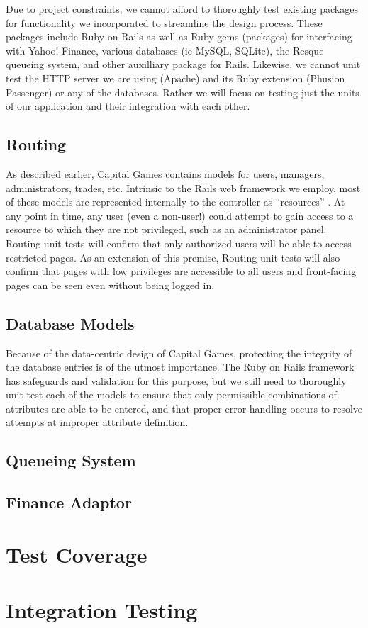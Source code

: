 Due to project constraints, we cannot afford to thoroughly
test existing packages for functionality we incorporated to
streamline the design process. These packages include Ruby
on Rails
as well as Ruby gems (packages) for interfacing with Yahoo! Finance,
various databases (ie MySQL, SQLite), the Resque queueing system,
and other auxilliary package for Rails. Likewise, we
cannot unit test
the HTTP server we are using (Apache) and its Ruby 
extension (Phusion Passenger) or any of the databases. Rather
we will focus on testing just the units of our application and
their integration with each other.

\subsection{Routing}

As described earlier, Capital Games contains models for
users, managers, administrators, trades, etc. Intrinsic to the Rails web framework
we employ, most of these models are represented internally to the 
controller as ``resources'' \cite{guides:routing}. At any
point in time, any user (even a non-user!) could attempt to gain
access to a resource to which they are not privileged, such as an
administrator panel. Routing unit tests will confirm that only
authorized users will be able to access restricted pages. As an
extension of this premise, Routing unit tests will also confirm
that pages with low privileges are accessible to all users and
front-facing pages can be seen even without being logged in.

\subsection{Database Models}

Because of the data-centric design of Capital Games, protecting the
integrity of the database entries is of the utmost importance. The
Ruby on Rails framework has safeguards and validation for this purpose,
but we still need to thoroughly unit test each of the models to ensure
that only permissible combinations of attributes are able to be entered,
and that proper error handling occurs to resolve attempts at improper
attribute definition.

\subsection{Queueing System}

\subsection{Finance Adaptor}

\section{Test Coverage}

\section{Integration Testing}
